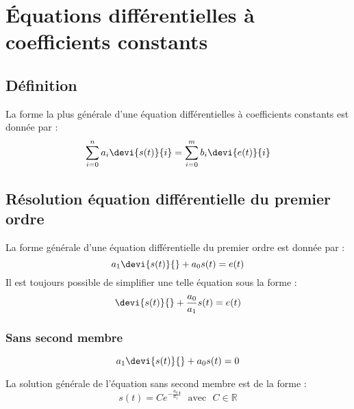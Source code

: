 \chapter{Équations différentielles à coefficients constants\label{annexe-eqndiff}}

\section{Définition}
La forme la plus générale d'une équation différentielles à coefficients constants est donnée
par :
\begin{align}
\sum_{i=0}^{n}a_i\devi{s(t)}{i}=\sum_{i=0}^{m}b_i\devi{e(t)}{i}
\end{align}


\section{Résolution équation différentielle du premier ordre}

La forme générale d'une équation différentielle du premier ordre est
donnée par : 
$$
a_1\devi{s(t)}{}+a_0s(t)=e(t)
$$
Il est toujours possible de simplifier une telle équation sous la forme :
$$
\devi{s(t)}{}+\dfrac{a_0}{a_1}s(t)=e(t)
$$


\subsection{Sans second membre}
$$
a_1\devi{s(t)}{}+a_0s(t)=0
$$

La solution générale de l'équation sans second membre est de la forme :
$$
s(t) = C e^{-\frac{a_0}{a_1}t}\,\,\,\,\text{avec}\,\,\,\,C\in\mathbb{R}
$$
